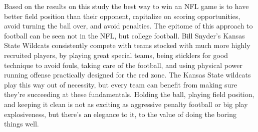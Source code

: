 \documentclass[12pt,english]{article}
\begin{document}
Based on the results on this study the best way to win an NFL game is to have better field position than their opponent, capitalize on scoring opportunities, avoid turning the ball over, and avoid penalties.  The epitome of this approach to football can be seen not in the NFL, but college football.  Bill Snyder's Kansas State Wildcats consistently compete with teams stocked with much more highly recruited players, by playing great special teams, being sticklers for good technique to avoid fouls, taking care of the football, and using physical power running offense practically designed for the red zone.  The Kansas State wildcats play this way out of necessity, but every team can benefit from making sure they're succeeding at these fundamentals.  Holding the ball, playing field position, and keeping it clean is not as exciting as aggressive penalty football or big play explosiveness, but there's an elegance to it, to the value of doing the boring things well.

\pagebreak{}


\begin{spacing}{1.0}


\end{spacing}

\vfill
\pagebreak{}
\clearpage
\end{document}
